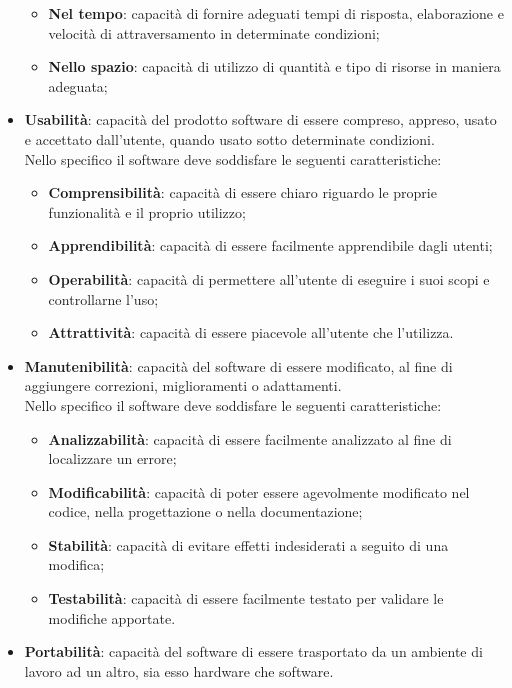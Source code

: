 \begin{itemize}
		\begin{itemize}
			\item \textbf{Nel tempo}: capacità di fornire adeguati tempi di risposta, elaborazione e velocità di attraversamento in determinate condizioni;
			\item \textbf{Nello spazio}: capacità di utilizzo di quantità e tipo di risorse in maniera adeguata;
		\end{itemize}
\item \textbf{Usabilità}: capacità del prodotto software di essere compreso, appreso, usato e accettato dall'utente, quando usato sotto determinate condizioni.\\
Nello specifico il software deve soddisfare le seguenti caratteristiche:
		\begin{itemize}
			\item \textbf{Comprensibilità}: capacità di essere chiaro riguardo le proprie funzionalità e il proprio utilizzo;
			\item \textbf{Apprendibilità}: capacità di essere facilmente apprendibile dagli utenti;
			\item \textbf{Operabilità}: capacità di permettere all'utente di eseguire i suoi scopi e controllarne l'uso;
			\item \textbf{Attrattività}: capacità di essere piacevole all'utente che l'utilizza.
		\end{itemize}
\item \textbf{Manutenibilità}: capacità del software di essere modificato, al fine di aggiungere correzioni, miglioramenti o adattamenti.\\
Nello specifico il software deve soddisfare le seguenti caratteristiche:
		\begin{itemize}
			\item \textbf{Analizzabilità}: capacità di essere facilmente analizzato al fine di localizzare un errore;
			\item \textbf{Modificabilità}: capacità di poter essere agevolmente modificato nel codice, nella progettazione o nella documentazione;
			\item \textbf{Stabilità}: capacità di evitare effetti indesiderati a seguito di una modifica;
			\item \textbf{Testabilità}: capacità di essere facilmente testato per validare le modifiche apportate.
		\end{itemize}
\item \textbf{Portabilità}: capacità del software di essere trasportato da un ambiente di lavoro ad un altro, sia esso hardware che software.\\

\end{itemize}
